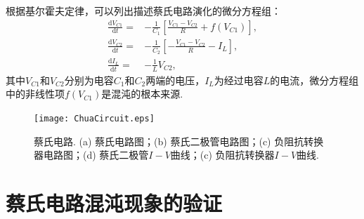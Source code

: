 \documentclass[a4paper, 10pt]{article}
\begin{document}
\begin{multicols*}{2}
根据基尔霍夫定律，可以列出描述蔡氏电路演化的微分方程组：
\begin{align}
    \label{Kirchhoff-ode-1}
    \frac{\mathrm{d}V_{C1}}{\mathrm{d}t}=&-\frac{1}{C_1}\left[\frac{V_{C1}-V_{C2}}{R}+f(V_{C1})\right],\\
    \frac{\mathrm{d}V_{C2}}{\mathrm{d}t}=&-\frac{1}{C_2}\left[-\frac{V_{C1}-V_{C2}}{R}-I_L\right],\\
    \label{Kirchhoff-ode-3}
    \frac{\mathrm{d}I_L}{\mathrm{d}t}=&-\frac{1}{L}V_{C2},
\end{align}
其中$V_{C1}$和$V_{C2}$分别为电容$C_1$和$C_2$两端的电压，$I_L$为经过电容$L$的电流，微分方程组中的非线性项$f(V_{C1})$是混沌的根本来源.

\begin{figure}[H]
    \centering
    \texttt{[image: ChuaCircuit.eps]}
    \caption{蔡氏电路. (a) 蔡氏电路图；(b) 蔡氏二极管电路图；(c) 负阻抗转换器电路图；(d) 蔡氏二极管$I-V$曲线；(c) 负阻抗转换器$I-V$曲线.}
    \label{ChuaCircuit}
\end{figure}

\section{蔡氏电路混沌现象的验证}


\end{multicols*}
\end{document}
